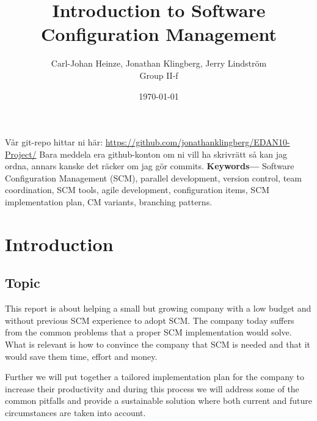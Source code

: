 \documentclass[10pt]{article}
\renewenvironment{abstract}
  {\small\quotation
  {\bfseries\noindent{\large\abstractname}\par\nobreak\smallskip}}
  {\endquotation}
\providecommand{\keywords}[1]{\textbf{{Keywords---}} #1}
\begin{document}
\makeatletter
\renewcommand{\@biblabel}[1]{\quad#1.}
\makeatother


\pagestyle{myheadings}



\begin{titlepage}
\title{Introduction to Software Configuration Management}
\author{Carl-Johan Heinze, Jonathan Klingberg, Jerry Lindström \\Group II-f}
\date{\today}
\maketitle
\thispagestyle{empty}
\end{titlepage}

\tableofcontents
\thispagestyle{empty}
\newpage
{}

\begin{abstract}
Vår git-repo hittar ni här: \url{https://github.com/jonathanklingberg/EDAN10-Project/}
Bara meddela era github-konton om ni vill ha skrivrätt så kan jag ordna, annars kanske det räcker om jag gör commits.
\end{abstract}
\keywords{Software Configuration Management (SCM), parallel development, version control, team coordination, SCM tools, agile development, configuration items, SCM implementation plan, CM variants, branching patterns.}


\section{Introduction}

\subsection{Topic}
This report is about helping a small but growing company with a low budget and without previous SCM experience to adopt SCM. The company today suffers from the common problems that a proper SCM implementation would solve. What is relevant is how to convince the company that SCM is needed and that it would save them time, effort and money. 

\noindent Further we will put together a tailored implementation plan for the company to increase their productivity and during this process we will address some of the common pitfalls and provide a sustainable solution where both current and future circumstances are taken into account.
\end{document}

